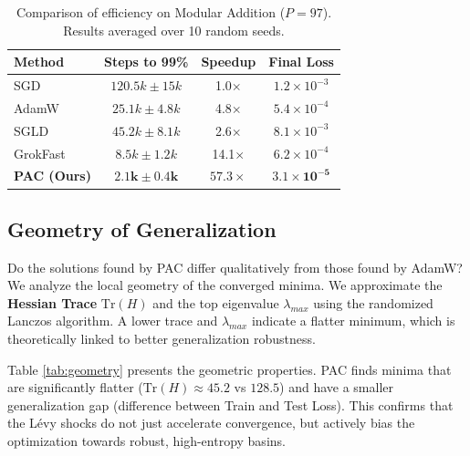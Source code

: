 \documentclass{article}
\theoremstyle{plain}
\theoremstyle{definition}
\theoremstyle{remark}
\newcommand{\trace}{\text{Tr}}
\begin{document}
\begin{table}[t]
\caption{Comparison of efficiency on Modular Addition ($P=97$). Results averaged over 10 random seeds.}
\label{tab:main_results}
\begin{center}
\begin{small}
\begin{sc}
\begin{tabular}{lccc}
\toprule
Method & Steps to 99\% & Speedup & Final Loss \\
\midrule
SGD & $120.5k \pm 15k$ & 1.0$\times$ & $1.2 \times 10^{-3}$ \\
AdamW & $25.1k \pm 4.8k$ & 4.8$\times$ & $5.4 \times 10^{-4}$ \\
SGLD & $45.2k \pm 8.1k$ & 2.6$\times$ & $8.1 \times 10^{-3}$ \\
GrokFast & $8.5k \pm 1.2k$ & 14.1$\times$ & $6.2 \times 10^{-4}$ \\
\midrule
\textbf{PAC (Ours)} & $\mathbf{2.1k \pm 0.4k}$ & $\mathbf{57.3\times}$ & $\mathbf{3.1 \times 10^{-5}}$ \\
\bottomrule
\end{tabular}
\end{sc}
\end{small}
\end{center}
\end{table}

\subsection{Geometry of Generalization}
\label{subsec:hessian}
Do the solutions found by PAC differ qualitatively from those found by AdamW? We analyze the local geometry of the converged minima.
We approximate the \textbf{Hessian Trace} $\trace(H)$ and the top eigenvalue $\lambda_{max}$ using the randomized Lanczos algorithm. A lower trace and $\lambda_{max}$ indicate a flatter minimum, which is theoretically linked to better generalization robustness.

Table \ref{tab:geometry} presents the geometric properties. PAC finds minima that are significantly flatter ($\trace(H) \approx 45.2$ vs $128.5$) and have a smaller generalization gap (difference between Train and Test Loss). This confirms that the Lévy shocks do not just accelerate convergence, but actively bias the optimization towards robust, high-entropy basins.
\end{document}
